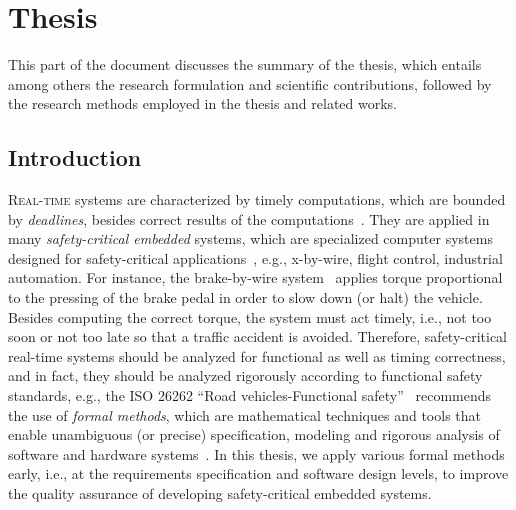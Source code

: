\part{Thesis}%
This part of the document discusses the summary of the thesis, which entails among others the research formulation and scientific contributions, followed by the research methods employed in the thesis and related works.

\chapter{Introduction}\label{chapter_introduction}
\lettrine{R}{eal-time} systems are characterized by timely computations, which are bounded by \textit{deadlines}, besides correct results of the computations~\cite{Buttazzo2003}. They are applied in many \textit{safety-critical embedded} systems, which are specialized computer systems designed for safety-critical applications~\cite{WangJiacun2017RES}, e.g., x-by-wire, flight control, industrial automation. For instance, the brake-by-wire system~\cite{Navet2010DesignSystems} applies torque proportional to the pressing of the brake pedal in order to slow down (or halt) the vehicle. Besides computing the correct torque, the system must act timely, i.e., not too soon or not too late so that a traffic accident is avoided. Therefore, safety-critical real-time systems should be analyzed for functional as well as timing correctness, and in fact, they should be analyzed rigorously according to functional safety standards, e.g., the ISO 26262 ``Road vehicles-Functional safety''~\cite{iso201126262} recommends the use of \textit{formal methods}, which are mathematical techniques and tools that enable unambiguous (or precise) specification, modeling and rigorous analysis of software and hardware systems~\cite{o2017concise}. In this thesis, we apply various formal methods early, i.e., at the requirements specification and software design levels, to improve the quality assurance of developing safety-critical embedded systems.

